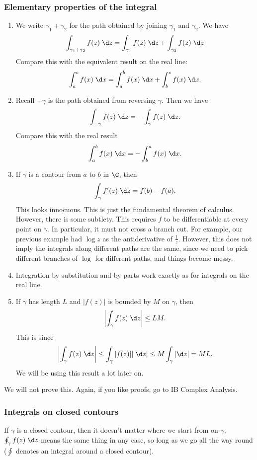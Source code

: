 \documentclass[a4paper]{article}
\begin{document}
\subsubsection*{Elementary properties of the integral}
\begin{prop}\leavevmode
  \begin{enumerate}
    \item We write $\gamma_1 + \gamma_2$ for the path obtained by joining $\gamma_1$ and $\gamma_2$. We have
      \[
        \int_{\gamma_1 + \gamma_2} f(z)\;\d z = \int_{\gamma_1} f(z)\;\d z + \int_{\gamma_2} f(z)\;\d z\\
      \]
      Compare this with the equivalent result on the real line:
      \[
        \int_a^c f(x)\;\d x = \int_a^b f(x)\;\d x + \int_b^c f(x)\;\d x.
      \]
    \item Recall $-\gamma$ is the path obtained from reversing $\gamma$. Then we have
      \[
        \int_{-\gamma} f(z)\;\d z = -\int_\gamma f(z)\;\d z.
      \]
      Compare this with the real result
      \[
        \int_a^b f(x)\;\d x = -\int_b^a f(x)\;\d x.
      \]
    \item If $\gamma$ is a contour from $a$ to $b$ in $\C$, then
      \[
        \int_\gamma f'(z)\;\d z = f(b) - f(a).
      \]
      This looks innocuous. This is just the fundamental theorem of calculus. However, there is some subtlety. This requires $f$ to be differentiable at every point on $\gamma$. In particular, it must not cross a branch cut. For example, our previous example had $\log z$ as the antiderivative of $\frac{1}{z}$. However, this does not imply the integrals along different paths are the same, since we need to pick different branches of $\log$ for different paths, and things become messy.

    \item Integration by substitution and by parts work exactly as for integrals on the real line.
    \item If $\gamma$ has length $L$ and $|f(z)|$ is bounded by $M$ on $\gamma$, then
      \[
        \left|\int_\gamma f(z)\;\d z\right| \leq L M.
      \]
      This is since
      \[
        \left|\int_\gamma f(z)\;\d z\right| \leq \int_\gamma |f(z)| |\;\d z| \leq M \int_\gamma |\d z| = ML.
      \]
      We will be using this result a lot later on.
  \end{enumerate}
\end{prop}
We will not prove this. Again, if you like proofs, go to IB Complex Analysis.

\subsubsection*{Integrals on closed contours}
If $\gamma$ is a closed contour, then it doesn't matter where we start from on $\gamma$; $\oint_\gamma f(z)\;\d z$ means the same thing in any case, so long as we go all the way round ($\oint$ denotes an integral around a closed contour).
\end{document}
